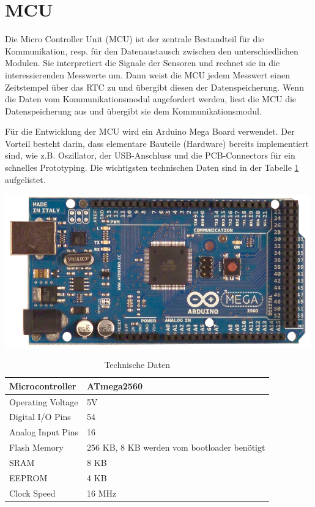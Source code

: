\section{MCU}
Die Micro Controller Unit (MCU) ist der zentrale Bestandteil für die Kommunikation, resp. für den Datenaustausch zwischen den unterschiedlichen Modulen. Sie interpretiert die Signale der Sensoren und rechnet sie in die interessierenden Messwerte um. Dann weist die MCU jedem Messwert einen Zeitstempel über das RTC zu und übergibt diesen der Datenspeicherung. Wenn die Daten vom Kommunikationsmodul angefordert werden, liest die MCU die Datenspeicherung aus und übergibt sie dem Kommunikationsmodul.\\

{\begin{minipage}[b][130pt][t]{0.5\textwidth}
Für die Entwicklung der MCU wird ein Arduino Mega Board verwendet. Der Vorteil besteht darin, dass elementare Bauteile (Hardware) bereits implementiert sind, wie z.B. Oszillator, der USB-Anschluss und die PCB-Connectors für ein schnelles Prototyping. Die wichtigsten technischen Daten sind in der Tabelle \ref{tab:arduinoMega_technischeDaten} aufgelistet.\\
\end{minipage}}
\hfill
{\begin{minipage}[b][130pt][t]{0.49\textwidth}
\centering
\includegraphics[width=0.99\textwidth]{graphics/MCU/arduino_mega.png}
\label{fig:arduinoMega}
\end{minipage}}

\begin{table}[h]
\centering
\caption{Technische Daten \cite[S.3]{arduinoMega}}
\begin{tabular}{|l|l|}
\hline 
Microcontroller & ATmega2560 \\ 
\hline 
Operating Voltage & 5V \\ 
\hline 
Digital I/O Pins & 54  \\ 
\hline 
Analog Input Pins & 16 \\ 
\hline 
Flash Memory & 256 KB, 8 KB werden vom bootloader benötigt\\ 
\hline 
SRAM & 8 KB \\ 
\hline 
EEPROM & 4 KB \\ 
\hline 
Clock Speed & 16 MHz \\ 
\hline 
\end{tabular}
\label{tab:arduinoMega_technischeDaten}
\end{table}

